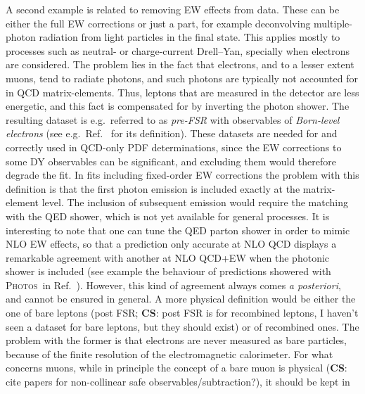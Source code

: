 
A second example is related to removing EW effects from data. These can be either the full EW corrections
or just a part, for example deconvolving multiple-photon radiation from light particles in the final state. This applies mostly
to processes such as neutral- or charge-current Drell--Yan, specially when electrons are considered. The problem lies in the fact that
 electrons, and to a lesser extent muons, tend to radiate photons, and such photons are typically not accounted
for in QCD matrix-elements. Thus, leptons that are measured in the detector are less energetic, and this fact is compensated for
by inverting the photon shower. The resulting dataset is e.g.\ referred to as \emph{pre-FSR} with observables of \emph{Born-level electrons} (see e.g.\ Ref.~\cite{Aad:2015auj} for
its definition).
These datasets are needed for and correctly used in QCD-only PDF determinations, since the EW corrections to some DY observables can be significant, and excluding them would therefore degrade the fit.
In fits including fixed-order EW corrections the problem with this definition is that the first photon emission is included exactly at the matrix-element level. The inclusion of
subsequent emission would require the matching with the QED shower, which is not yet available for general processes. It is interesting
to note that one can tune the QED parton shower in order to mimic NLO EW effects, so that a prediction only accurate at NLO
QCD displays a remarkable agreement with another at NLO QCD+EW when the photonic shower is included (see example the behaviour of predictions showered with
\textsc{Photos}~\cite{Barberio:1990ms,Barberio:1993qi,Golonka:2005pn}in Ref.~\cite{CarloniCalame:2016ouw}). However, this kind of agreement
always comes \emph{a posteriori}, and cannot be ensured in general. A more physical definition would be either the one of bare leptons (post FSR; \textbf{CS}: post FSR is for recombined leptons, I haven't seen a dataset for bare leptons, but they should exist)
or of recombined ones. The problem with the former is that 
electrons are never measured as bare particles, because of the finite resolution 
of the electromagnetic calorimeter. For what concerns muons, while in principle the concept of a bare muon is physical (\textbf{CS}: cite papers for non-collinear safe observables/subtraction?), it should be kept in
